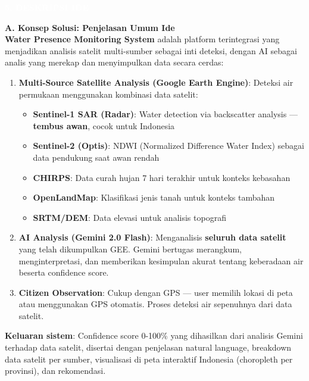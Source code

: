 \documentclass[12pt,a4paper]{article}
\newcommand{\sectionbox}[1]{%
  \colorbox{samsungblue}{%
    \parbox{\textwidth}{%
      \textcolor{white}{\large\bfseries #1}%
    }%
  }%
}
\newcommand{\subsectionbox}[1]{%
  \textbf{\large #1}\\[0.3cm]
}
\begin{document}
\vspace{1cm}

\sectionbox{5. DESKRIPSI IDE}

\vspace{0.5cm}

\subsectionbox{A. Konsep Solusi: Penjelasan Umum Ide}

\textbf{Water Presence Monitoring System} adalah platform terintegrasi yang menjadikan analisis satelit multi-sumber sebagai inti deteksi, dengan AI sebagai analis yang merekap dan menyimpulkan data secara cerdas:

\begin{enumerate}
  \item \textbf{Multi-Source Satellite Analysis (Google Earth Engine)}: Deteksi air permukaan menggunakan kombinasi data satelit:
  \begin{itemize}
    \item \textbf{Sentinel-1 SAR (Radar)}: Water detection via backscatter analysis — \textbf{tembus awan}, cocok untuk Indonesia
    \item \textbf{Sentinel-2 (Optis)}: NDWI (Normalized Difference Water Index) sebagai data pendukung saat awan rendah
    \item \textbf{CHIRPS}: Data curah hujan 7 hari terakhir untuk konteks kebasahan
    \item \textbf{OpenLandMap}: Klasifikasi jenis tanah untuk konteks tambahan
    \item \textbf{SRTM/DEM}: Data elevasi untuk analisis topografi
  \end{itemize}
  \item \textbf{AI Analysis (Gemini 2.0 Flash)}: Menganalisis \textbf{seluruh data satelit} yang telah dikumpulkan GEE. Gemini bertugas merangkum, menginterpretasi, dan memberikan kesimpulan akurat tentang keberadaan air beserta confidence score.
  \item \textbf{Citizen Observation}: Cukup dengan GPS — user memilih lokasi di peta atau menggunakan GPS otomatis. Proses deteksi air sepenuhnya dari data satelit.
\end{enumerate}

\textbf{Keluaran sistem}: Confidence score 0-100\% yang dihasilkan dari analisis Gemini terhadap data satelit, disertai dengan penjelasan natural language, breakdown data satelit per sumber, visualisasi di peta interaktif Indonesia (choropleth per provinsi), dan rekomendasi.
\end{document}
